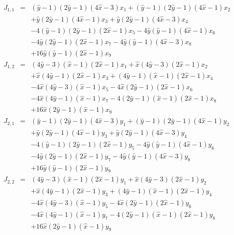 \clearpage
\begin{eqnarray}\label{eq:Q2Jacobian}
   J_{1,1}  & = &
         (\hat y - 1)(2\hat y - 1)(4\hat x - 3)x_1  
       + (\hat y- 1)(2\hat y - 1)(4\hat x - 1)x_2 \nonumber \\
   & & + \hat y(2\hat y - 1)(4\hat x - 1)x_3  
       + \hat y(2\hat y- 1)(4\hat x - 3)x_4 \nonumber \\
   & & - 4(\hat y - 1)(2\hat y - 1)(2\hat x - 1)x_5 
       - 4\hat y(\hat y - 1)(4\hat x - 1)x_6 \nonumber \\
   & & - 4\hat y(2\hat y - 1)(2\hat x - 1)x_7 
       - 4\hat y(\hat y - 1)(4\hat x- 3)x_8 \nonumber \\
   & & + 16\hat y(\hat y - 1)(2\hat x - 1)x_9 \nonumber \\
%
   J_{1,2} & = &
         (4\hat y - 3)(\hat x - 1)(2\hat x - 1)x_1 
       + \hat x(4\hat y - 3)(2\hat x - 1)x_2 \nonumber \\
   & & + \hat x(4\hat y - 1)(2\hat x - 1)x_3 
       + (4\hat y - 1)(\hat x - 1)(2\hat x - 1)x_4 \nonumber \\
   & & - 4\hat x(4\hat y - 3)(\hat x -1)x_5 
       - 4\hat x(2\hat y -1)(2\hat x - 1)x_6 \nonumber \\
   & & - 4\hat x(4\hat y - 1)(\hat x - 1)x_7 
       - 4(2\hat y - 1)(\hat x - 1)(2\hat x - 1)x_8 \nonumber \\
   & & + 16\hat x(2\hat y - 1)(\hat x - 1)x_9 \nonumber \\
%
   J_{2,1} & = &
         (\hat y - 1)(2\hat y - 1)(4\hat x - 3)y_1  
       + (\hat y- 1)(2\hat y - 1)(4\hat x - 1)y_2 \nonumber \\
   & & + \hat y(2\hat y - 1)(4\hat x - 1)y_3  
       + \hat y(2\hat y- 1)(4\hat x - 3)y_4 \nonumber \\
   & & - 4(\hat y - 1)(2\hat y - 1)(2\hat x - 1)y_5 
       - 4\hat y(\hat y - 1)(4\hat x - 1)y_6 \nonumber \\
   & & - 4\hat y(2\hat y - 1)(2\hat x - 1)y_7 
       - 4\hat y(\hat y - 1)(4\hat x- 3)y_8 \nonumber \\
   & & + 16\hat y(\hat y - 1)(2\hat x - 1)y_9 \nonumber \\
%
   J_{2,2} & = &
         (4\hat y - 3)(\hat x - 1)(2\hat x - 1)y_1 
       + \hat x(4\hat y - 3)(2\hat x - 1)y_2 \nonumber \\
   & & + \hat x(4\hat y - 1)(2\hat x - 1)y_3 
       + (4\hat y - 1)(\hat x - 1)(2\hat x - 1)y_4 \nonumber \\
   & & - 4\hat x(4\hat y - 3)(\hat x -1)y_5 
       - 4\hat x(2\hat y -1)(2\hat x - 1)y_6 \nonumber \\
   & & - 4\hat x(4\hat y - 1)(\hat x - 1)y_7 
       - 4(2\hat y - 1)(\hat x - 1)(2\hat x - 1)y_8 \nonumber \\
   & & + 16\hat x(2\hat y - 1)(\hat x - 1)y_9 \nonumber \\
\end{eqnarray}

